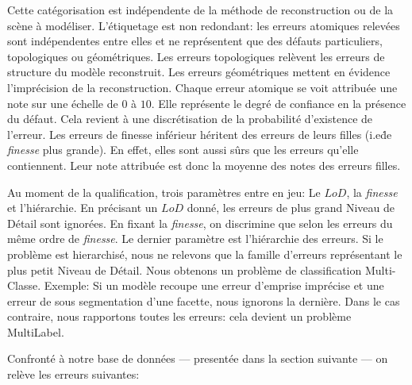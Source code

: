 \documentclass[a4paper,french]{article}
\begin{document}
    Cette catégorisation est indépendente de la méthode de reconstruction ou de la scène à modéliser. L'étiquetage est non redondant: les erreurs atomiques relevées sont indépendentes entre elles et ne représentent que des défauts particuliers, topologiques ou géométriques. Les erreurs topologiques relèvent les erreurs de structure du modèle reconstruit. Les erreurs géométriques mettent en évidence l'imprécision de la reconstruction. Chaque erreur atomique se voit attribuée une note sur une échelle de $0$ à $10$. Elle représente le degré de confiance en la présence du défaut. Cela revient à une discrétisation de la probabilité d'existence de l'erreur. Les erreurs de finesse inférieur héritent des erreurs de leurs filles (i.e\. de \emph{finesse} plus grande). En effet, elles sont aussi sûrs que les erreurs qu'elle contiennent. Leur note attribuée est donc la moyenne des notes des erreurs filles.

    Au moment de la qualification, trois paramètres entre en jeu: Le $LoD$, la \emph{finesse} et l'hiérarchie. En précisant un $LoD$ donné, les erreurs de plus grand Niveau de Détail sont ignorées. En fixant la \emph{finesse}, on discrimine que selon les erreurs du même ordre de \emph{finesse}. Le dernier paramètre est l'hiérarchie des erreurs. Si le problème est hierarchisé, nous ne relevons que la famille d'erreurs représentant le plus petit Niveau de Détail. Nous obtenons un problème de classification Multi-Classe. Exemple: Si un modèle recoupe une erreur d'emprise imprécise et une erreur de sous segmentation d'une facette, nous ignorons la dernière. Dans le cas contraire, nous rapportons toutes les erreurs: cela devient un problème MultiLabel.

    Confronté à notre base de données --- presentée dans la section suivante --- on relève les erreurs suivantes:
\end{document}
